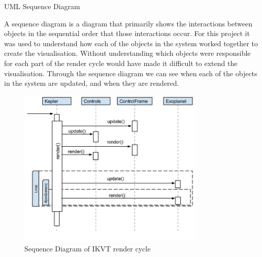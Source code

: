 \begin{enumerate}
 {\bf \item UML Sequence Diagram}
  A sequence diagram is a diagram that primarily shows the interactions between
objects in the sequential order that those interactions occur.
For this project it was used to understand how each of the objects in the system
worked together to create the visualisation. Without understanding which objects
were responsible for each part of the render cycle would have made it difficult
to extend the visualisation. Through the sequence diagram we can see when each
of the objects in the system are updated, and when they are rendered. 
   \begin{figure}[H]
  \centering
      \includegraphics[width=0.8\textwidth]{images/sequence.png}
  \caption{Sequence Diagram of IKVT render cycle}  
    \label{fig:sequenceDiagram}
\end{figure}


\end{enumerate}
